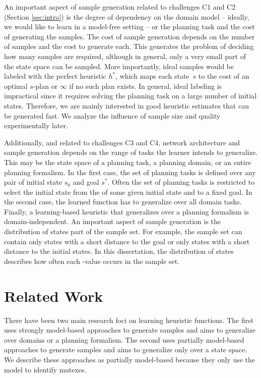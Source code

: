 An important aspect of sample generation related to challenges C1 and C2 (Section \ref{sec:intro}) is the degree of dependency on the domain model -- ideally, we would like to learn in a model-free setting -- or the planning task and the cost of generating the samples. The cost of sample generation depends on the number of samples and the cost to generate each. This generates the problem of deciding how many samples are required, although in general, only a very small part of the state space can be sampled. More importantly, ideal samples would be labeled with the perfect heuristic $h^*$, which maps each state~$s$ to the cost of an optimal $s$-plan or $\infty$ if no such plan exists. In general, ideal labeling is impractical since it requires solving the planning task on a large number of initial states. Therefore, we are mainly interested in good heuristic estimates that can be generated fast. We analyze the influence of sample size and quality experimentally later.

Additionally, and related to challenges C3 and C4, network architecture and sample generation depends on the range of tasks the learner intends to generalize. This may be the state space of a planning task, a planning domain, or an entire planning formalism. In the first case, the set of planning tasks is defined over any pair of initial state $s_0$ and goal $s^*$. Often the set of planning tasks is restricted to select the initial state from the \fssp of some given initial state and to a fixed goal. In the second case, the learned function has to generalize over all domain tasks. Finally, a learning-based heuristic that generalizes over a planning formalism is domain-independent. An important aspect of sample generation is the distribution of states part of the sample set. For example, the sample set can contain only states with a short distance to the goal or only states with a short distance to the initial states. In this dissertation, the distribution of states describes how often each \hstar-value occurs in the sample set.

\section{Related Work}
\label{sec:background_relatedwork}

There have been two main research foci on learning heuristic functions. The first uses strongly model-based approaches to generate samples and aims to generalize over domains or a planning formalism. The second uses partially model-based approaches to generate samples and aims to generalize only over a state space. We describe these approaches as partially model-based because they only use the model to identify mutexes.

